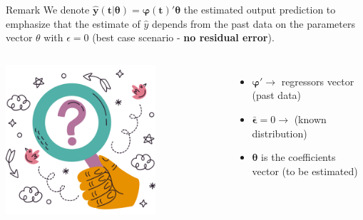 \documentclass[aspectratio=169,hyperref={pdfpagelabels=false}]{beamer}
\begin{document}
\begin{frame}{}
  \begin{block}{Remark}
    We denote $\bm{\hat{y}(t|\theta) = \varphi(t)'\theta}$ the estimated output prediction
  to emphasize that the estimate of $\hat{y}$ depends from the past data on the parameters vector $\theta$ with $\epsilon=0$ (best case scenario - \textbf{no residual error}).
  \end{block}
  
  \vspace{2em}  
  \begin{columns}
     \includegraphics[width=0.7\textwidth]{img/pic5.png} \centering
    \begin{itemize}
      \item $\bm{\varphi}' \rightarrow$ regressors vector (past data)
      \item $\bm{\bar{\epsilon}} = 0 \rightarrow $ (known distribution)
      \item {$\bm{\theta}$ is the coefficients vector (to be estimated)}
    \end{itemize}
    \end{columns}
\end{frame}
\end{document}
